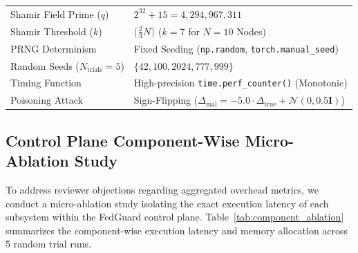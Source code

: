\begin{table}[htbp]
\begin{center}
{\begin{tabular}{|l|l|}
Shamir Field Prime ($q$) & $2^{32} + 15 = 4,294,967,311$ \\
Shamir Threshold ($k$) & $\lceil \frac{2}{3} N \rceil$ ($k=7$ for $N=10$ Nodes) \\
\hline
PRNG Determinism & Fixed Seeding (\texttt{np.random}, \texttt{torch.manual\_seed}) \\
Random Seeds ($N_{\text{trials}}=5$) & $\{42, 100, 2024, 777, 999\}$ \\
Timing Function & High-precision \texttt{time.perf\_counter()} (Monotonic) \\
Poisoning Attack & Sign-Flipping ($\Delta_{\text{mal}} = -5.0 \cdot \Delta_{\text{true}} + \mathcal{N}(0, 0.5 \mathbf{I})$) \\
\hline
\end{tabular}%
}
\label{tab:reproducibility_params}
\end{center}
\end{table}

\subsection{Control Plane Component-Wise Micro-Ablation Study}

To address reviewer objections regarding aggregated overhead metrics, we conduct a micro-ablation study isolating the exact execution latency of each subsystem within the FedGuard control plane. Table~\ref{tab:component_ablation} summarizes the component-wise execution latency and memory allocation across 5 random trial runs.

\begin{table}[htbp]
\caption{Component-Wise Execution Latency and Memory Micro-Ablation ($\text{Mean} \pm \text{Std Dev}$, $N_{\text{trials}}=5$)}
\begin{center}
\label{tab:component_ablation}
\end{center}
\end{table}

